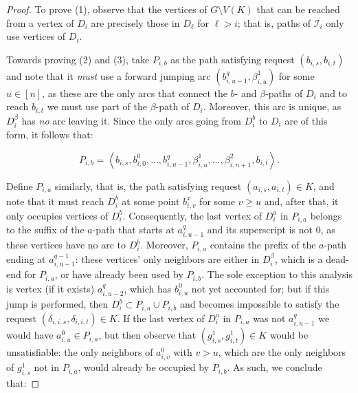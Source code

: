\documentclass[a4paper,UKenglish,cleveref, autoref, thm-restate]{lipics-v2021}
\newcommand{\angled}[1]{\left\langle{#1}\right\rangle}
\begin{document}
    \begin{proof}
      To prove (1), observe that the vertices of $G \setminus V(K)$ that
      can be reached from a vertex of $D_i$ are precisely those in $D_\ell$ for $\ell >
      i$; that is, paths of $\mathcal{I}_i$ only use vertices of $D_i$.

      Towards proving (2) and (3), take $P_{i,b}$ as the path satisfying request
      $(b_{i,s}, b_{i,t})$ and note that it \textit{must} use a forward jumping arc
      $(b^q_{i,u-1},\beta^1_{i,u})$ for some $u \in [n]$, as these are the
      only arcs that connect the $b$- and $\beta$-paths of $D_i$ and to reach $b_{i,t}$
      we must use part of the $\beta$-path of $D_i$.
      Moreover, this arc is unique, as $D^\beta_i$ has \textit{no} arc leaving it.
      Since the only arcs going from $D^b_i$ to $D_i$ are of this form, it follows that:

      \begin{equation*}
        P_{i,b} = \angled{b_{i,s}, b^0_{i,0}, \dots, b^q_{i, u-1}, \beta^1_{i, u}, \dots,
        \beta^2_{i, n+1}, b_{i,t}}.
      \end{equation*}

      Define $P_{i,a}$ similarly, that is, the path satisfying request $(a_{i,s},
      a_{i,t}) \in K$, and note that it must reach $D^b_{i}$ at some point
      $b^x_{i,v}$ for some $v \geq u$ and, after that, it only occupies vertices of $D^b_i$.
      Consequently, the last vertex of $D^a_i$ in $P_{i,a}$ belongs to the suffix of the
      $a$-path that starts at $a^q_{i,u-1}$ and its superscript is not 0, as these
      vertices have no arc to $D^b_i$.
      Moreover, $P_{i,a}$ contains the prefix of the $a$-path ending at
      $a^{q-1}_{i,u-1}$: these vertices' only neighbors are either in $D^\beta_i$, which
      is a dead-end for $P_{i,a}$, or have already been used by $P_{i,b}$.
      The sole exception to this analysis is vertex (if it exists) $a^q_{i,u-2}$, which
      has $b^0_{i,u}$ not yet accounted for; but if this jump is performed, then
      $D^b_i \subset P_{i,a} \cup P_{i,b}$ and becomes impossible to satisfy the request
      $(\delta_{i,i,s}, \delta_{i,i,t}) \in K$.
      If the last vertex of $D^a_i$ in $P_{i,a}$ was not $a^q_{i,u-1}$ we would have
      $a^0_{i,u} \in P_{i,a}$, but then observe that $(g^1_{i,s}, g^1_{i,t}) \in K$ would
      be unsatisfiable: the only neighbors of $a^0_{i,v}$ with $v > u$, which are the
      only neighbors of $g^1_{i,s}$ not in $P_{i,a}$, would already be occupied by $P_{i,b}$.
      As such, we conclude that:


\end{proof}
\end{document}
